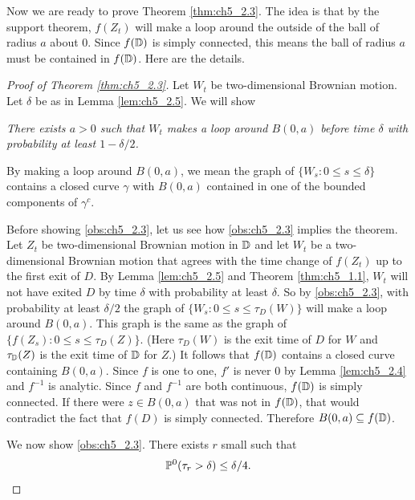 Now we are ready to prove Theorem \ref{thm:ch5_2.3}. The idea is that by the support theorem, $f(Z_t)$ will make a loop around the outside of the ball of radius $a$ about $0$. Since $f(\D)$ is simply connected, this means the ball of radius $a$ must be contained in $f(\D)$. Here are the details.


\begin{proof}[Proof of Theorem \ref{thm:ch5_2.3}]
Let $W_t$ be two-dimensional Brownian motion. Let $\delta$ be as in Lemma \ref{lem:ch5_2.5}. We will show
\begin{obs}\label{obs:ch5_2.3}
    \textit{There exists $a > 0$ such that $W_t$ makes a loop around $B(0,a)$ before time $\delta$ with probability at least $1-\delta/2$.}
\end{obs}

By making a loop around $B(0,a)$, we mean the graph of $\{W_s:0\leq s \leq \delta\}$ contains a closed curve $\gamma$ with $B(0,a)$ contained in one of the bounded components of $\gamma^c$.

Before showing \eqref{obs:ch5_2.3}, let us see how \eqref{obs:ch5_2.3} implies the theorem. Let $Z_t$ be two-dimensional Brownian motion in $\D$ and let $W_t$ be a two-dimensional Brownian motion that agrees with the time change of $f(Z_t)$ up to the first exit of $D$. By Lemma \ref{lem:ch5_2.5} and Theorem \ref{thm:ch5_1.1}, $W_t$ will not have exited $D$ by time $\delta$ with probability at least $\delta$. So by \eqref{obs:ch5_2.3}, with probability at least $\delta/2$ the graph of $\{W_s : 0 \leq s \leq \tau_D(W)\}$ will make a loop around $B(0,a)$. This graph is the same as the graph of $\{f(Z_s) : 0 \leq s \leq \tau_D(Z)\}$. (Here $\tau_D(W)$ is the exit time of $D$ for $W$ and $\tau_{\D}(Z)$ is the exit time of $\D$ for $Z$.) It follows that $f(\D)$ contains a closed curve containing $B(0,a)$. Since $f$ is one to one, $f'$ is never $0$ by Lemma \ref{lem:ch5_2.4} and $f^{-1}$ is analytic. Since $f$ and $f^{-1}$ are both continuous, $f(\D)$ is simply connected. If there were $z \in B(0,a)$ that was not in $f(\D)$, that would contradict the fact that $f(D)$ is simply connected. Therefore $B(0,a) \subseteq f(\D)$.

We now show \eqref{obs:ch5_2.3}. There exists $r$ small such that
\begin{equation}\label{eq:ch5_2.4}
    \P^0(\tau_r>\delta)\leq \delta/4.
\end{equation}


\end{proof}
